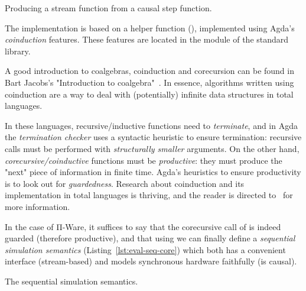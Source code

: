             \begin{listing}[h]
                \caption{Producing a stream function from a causal step function.\label{lst:run-causal}}
            \end{listing}

            The implementation is based on a helper function (),
            implemented using Agda's \emph{coinduction} features.
            These features are located in the  module of the standard library.

            A good introduction to coalgebras, coinduction and corecursion can be found in
            Bart Jacobs's "Introduction to coalgebra"~\cite{introduction-coalgebra-jacobs}.
            In essence, algorithms written using coinduction are a way to deal with (potentially) infinite
            data structures in total languages.

            In these languages, recursive/inductive functions need to \emph{terminate},
            and in Agda the \emph{termination checker} uses a syntactic heuristic to ensure termination:
            recursive calls must be performed with \emph{structurally smaller} arguments.
            On the other hand, \emph{corecursive/coinductive} functions must be \emph{productive}:
            they must produce the "next" piece of information in finite time.
            Agda's heuristics to ensure productivity is to look out for \emph{guardedness}.
            Research about coinduction and its implementation in total languages is thriving,
            and the reader is directed to~\cite{coinductive-inductive-termination} for more information.

            In the case of Π-Ware, it suffices to say that the corecursive call of 
            is indeed guarded (therefore productive), and that using  we can finally define
            a \emph{sequential simulation semantics} (Listing~\ref{lst:eval-seq-core}) which both
            has a convenient interface (stream-based) and models synchronous hardware faithfully (is causal).

            \begin{listing}[h]
                \caption{The sequential simulation semantics.\label{lst:eval-seq-core}}
            \end{listing}


